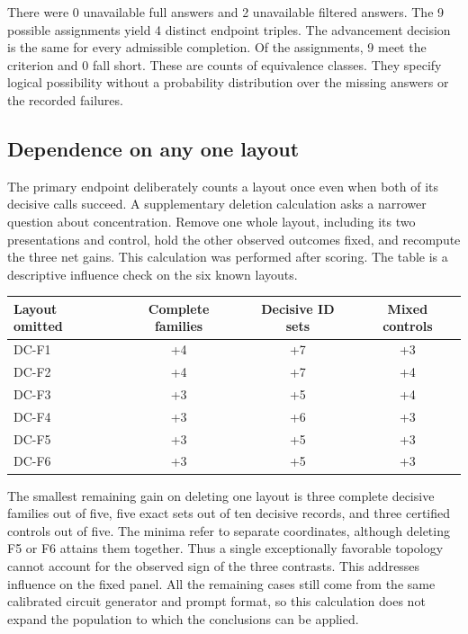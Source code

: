 \documentclass[12pt,letterpaper]{article}
\begin{document}
There were 0 unavailable full answers and 2 unavailable filtered answers. The 9 possible assignments yield 4 distinct endpoint triples. The advancement decision is the same for every admissible completion. Of the assignments, 9 meet the criterion and 0 fall short. These are counts of equivalence classes. They specify logical possibility without a probability distribution over the missing answers or the recorded failures.

\subsection{Dependence on any one layout}

The primary endpoint deliberately counts a layout once even when both of its decisive calls succeed. A supplementary deletion calculation asks a narrower question about concentration. Remove one whole layout, including its two presentations and control, hold the other observed outcomes fixed, and recompute the three net gains. This calculation was performed after scoring. The table is a descriptive influence check on the six known layouts.

\begin{center}{\small\setlength{\tabcolsep}{4pt}\begin{tabularx}{\linewidth}{@{}Yccc@{}}\toprule
Layout omitted & Complete families & Decisive ID sets & Mixed controls\\ \midrule
DC-F1 & +4 & +7 & +3\\
DC-F2 & +4 & +7 & +4\\
DC-F3 & +3 & +5 & +4\\
DC-F4 & +3 & +6 & +3\\
DC-F5 & +3 & +5 & +3\\
DC-F6 & +3 & +5 & +3\\ \bottomrule\end{tabularx}}
\end{center}

The smallest remaining gain on deleting one layout is three complete decisive families out of five, five exact sets out of ten decisive records, and three certified controls out of five. The minima refer to separate coordinates, although deleting F5 or F6 attains them together. Thus a single exceptionally favorable topology cannot account for the observed sign of the three contrasts. This addresses influence on the fixed panel. All the remaining cases still come from the same calibrated circuit generator and prompt format, so this calculation does not expand the population to which the conclusions can be applied.
\end{document}
